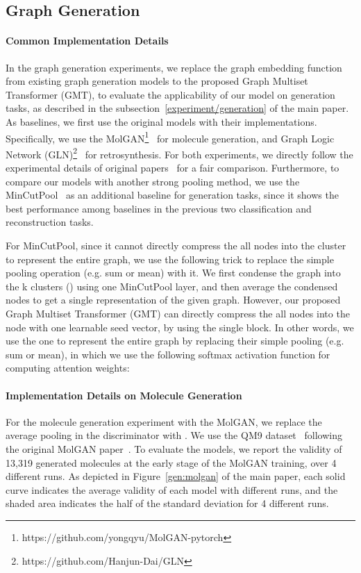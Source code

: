 \subsection{Graph Generation \label{appendix/generation/experimentaldetail}}

\paragraph{Common Implementation Details}
In the graph generation experiments, we replace the graph embedding function  from existing graph generation models to the proposed Graph Multiset Transformer (GMT), to evaluate the applicability of our model on generation tasks, as described in the subsection~\ref{experiment/generation} of the main paper. As baselines, we first use the original models with their implementations. Specifically, we use the MolGAN\footnote{https://github.com/yongqyu/MolGAN-pytorch}~\citep{MolGAN} for molecule generation, and Graph Logic Network (GLN)\footnote{https://github.com/Hanjun-Dai/GLN}~\citep{GLN} for retrosynthesis. For both experiments, we directly follow the experimental details of original papers~\citep{MolGAN, GLN} for a fair comparison. Furthermore, to compare our models with another strong pooling method, we use the MinCutPool~\citep{MincutPool} as an additional baseline for generation tasks, since it shows the best performance among baselines in the previous two classification and reconstruction tasks.


For MinCutPool, since it cannot directly compress the all  nodes into the  cluster to represent the entire graph, we use the following trick to replace the simple pooling operation (e.g. sum or mean) with it. We first condense the graph into the k clusters () using one MinCutPool layer, and then average the condensed nodes to get a single representation of the given graph. However, our proposed Graph Multiset Transformer (GMT) can directly compress the all  nodes into the  node with one learnable seed vector, by using the single  block. In other words, we use the one  to represent the entire graph by replacing their simple pooling (e.g. sum or mean), in which we use the following softmax activation function for computing attention weights:



\paragraph{Implementation Details on Molecule Generation}
For the molecule generation experiment with the MolGAN, we replace the average pooling in the discriminator with . We use the QM9 dataset~\citep{qm9} following the original MolGAN paper~\citep{MolGAN}. To evaluate the models, we report the validity of 13,319 generated molecules at the early stage of the MolGAN training, over 4 different runs. As depicted in Figure~\ref{gen:molgan} of the main paper, each solid curve indicates the average validity of each model with  different runs, and the shaded area indicates the half of the standard deviation for 4 different runs.


